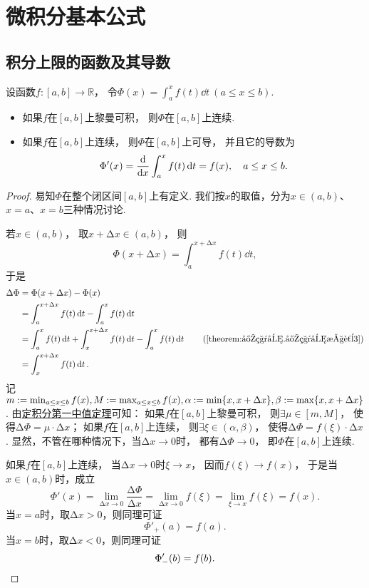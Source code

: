 \section{微积分基本公式}
\subsection{积分上限的函数及其导数}
\begin{theorem}\label{theorem:定积分.变限积分定理}
设函数\(f\colon[a,b]\to\mathbb{R}\)，
令\(\Phi(x)
= \int_a^x f(t) \dd{t}
\ (a \leq x \leq b)\).
\begin{itemize}
	\item 如果\(f\)在\([a,b]\)上黎曼可积，
	则\(\Phi\)在\([a,b]\)上连续.

	\item 如果\(f\)在\([a,b]\)上连续，
	则\(\Phi\)在\([a,b]\)上可导，
	并且它的导数为\[
		\Phi'(x)
		= \dv{x} \int_a^x f(t) \dd{t}
		= f(x),
		\quad a \leq x \leq b.
	\]
\end{itemize}
\begin{proof}
易知\(\Phi\)在整个闭区间\([a,b]\)上有定义.
我们按\(x\)的取值，分为\(x\in(a,b)\)、\(x=a\)、\(x=b\)三种情况讨论.

若\(x\in(a,b)\)，
取\(x + \increment x \in (a,b)\)，
则\[
	\Phi(x + \increment x) = \int_a^{x+\increment x} f(t) \dd{t},
\]
于是\begin{align*}
	\increment\Phi
	&= \Phi(x + \increment x) - \Phi(x) \\
	&= \int_a^{x+\increment x} f(t) \dd{t} - \int_a^x f(t) \dd{t} \\
	&= \int_a^x f(t) \dd{t} + \int_x^{x+\increment x} f(t) \dd{t} - \int_a^x f(t) \dd{t}
		\tag{\cref{theorem:定积分.定积分性质3}} \\
	&= \int_x^{x+\increment x} f(t) \dd{t}.
\end{align*}
记\(m := \min_{a \leq x \leq b} f(x),
M := \max_{a \leq x \leq b} f(x),
\alpha := \min\{x,x+\Delta x\},
\beta := \max\{x,x+\Delta x\}\).
由\hyperref[theorem:定积分.积分中值定理1]{定积分第一中值定理}可知：
如果\(f\)在\([a,b]\)上黎曼可积，
则\(\exists\mu\in[m,M]\)，
使得\(\increment\Phi = \mu \cdot \increment x\)；
如果\(f\)在\([a,b]\)上连续，
则\(\exists\xi\in(\alpha,\beta)\)，
使得\(\increment\Phi = f(\xi) \cdot \increment x\).
显然，不管在哪种情况下，当\(\increment x\to0\)时，
都有\(\increment\Phi\to0\)，
即\(\Phi\)在\([a,b]\)上连续.

如果\(f\)在\([a,b]\)上连续，
当\(\increment x\to0\)时\(\xi \to x\)，
因而\(f(\xi) \to f(x)\)，
于是当\(x\in(a,b)\)时，成立\[
	\Phi'(x)
	= \lim_{\increment x\to0} \frac{\increment\Phi}{\increment x}
	= \lim_{\increment x\to0} f(\xi)
	= \lim_{\xi \to x} f(\xi)
	= f(x).
\]
当\(x = a\)时，取\(\increment x > 0\)，则同理可证\[
	\Phi'_+(a) = f(a).
\]
当\(x = b\)时，取\(\increment x < 0\)，则同理可证\[
	\Phi'_-(b) = f(b).
	\qedhere
\]
\end{proof}
\end{theorem}
